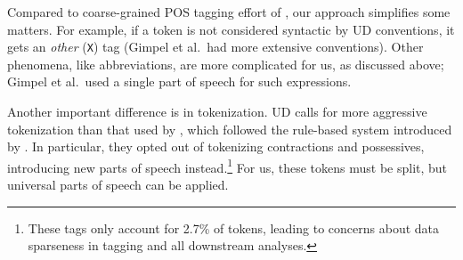 \documentclass[11pt,a4paper]{article}
\begin{document}
Compared to coarse-grained POS tagging effort of
, our approach simplifies some
matters.  For example, if a token is not considered syntactic by UD
conventions, it gets an \emph{other} (\texttt{X}) tag (Gimpel et
al.~had more extensive conventions).  Other phenomena, like
abbreviations, are more complicated for us, as discussed above;
Gimpel et al.~used a single part of speech for such expressions.


Another important difference is in tokenization.  UD calls for more
aggressive tokenization than that used by
, which followed the rule-based
system  introduced by 
.  In particular, they opted out of tokenizing
contractions and possessives, introducing new parts of speech
instead.\footnote{These tags only account for 2.7\% of tokens,
  leading to concerns about data sparseness in tagging and all
  downstream analyses.}  For us, these tokens must be split, but
universal parts of speech can be applied.
\end{document}
